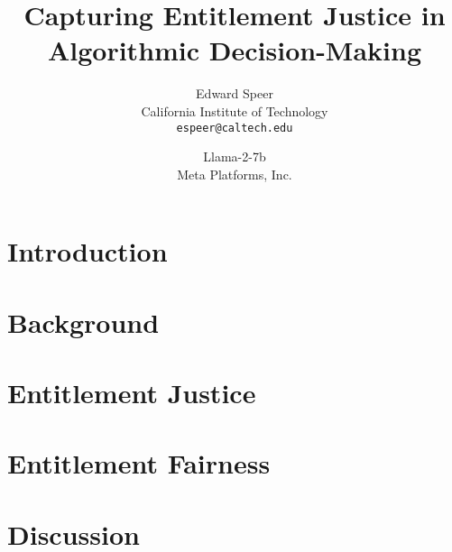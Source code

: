 \documentclass[11pt, a4paper, hyphens]{article}
\title{Capturing Entitlement Justice in Algorithmic Decision-Making}
\author{%
  Edward Speer
  \\
  California Institute of Technology\\
  \texttt{espeer@caltech.edu} \\
   \and
  Llama-2-7b \\
  Meta Platforms, Inc. \\
}
\date{\monthyeardate}
\begin{document}
\maketitle

%     

\section{Introduction}\label{sec:introduction}


\section{Background}\label{sec:background}


\section{Entitlement Justice}\label{sec:entitlement-justice}


\section{Entitlement Fairness}\label{sec:entitlement-fairness}


\section{Discussion}\label{sec:conclusion}


\pagebreak

\end{document}
